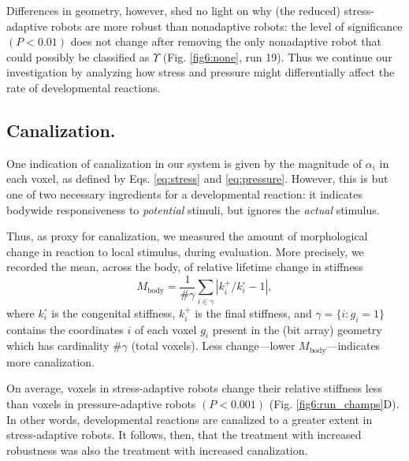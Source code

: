 Differences in geometry, however, shed no light on why (the reduced) stress-adaptive robots are more robust than nonadaptive robots:
the level of significance $(P<0.01)$ does not change after removing the only nonadaptive robot that could possibly be classified as $\Upsilon$ (Fig. \ref{fig6:none}, run 19). 
Thus we continue our investigation by analyzing how stress and pressure might differentially affect the rate of developmental reactions.


\subsection*{Canalization.}

One indication of canalization \citep{waddington1942canalization,kriegman2017morphological} in our system is given by the magnitude of $\alpha_i$ in each voxel, as defined by Eqs. \ref{eq:stress} and \ref{eq:pressure}.
However, this is but one of two necessary ingredients for a developmental reaction: it indicates bodywide responsiveness to \textit{potential} stimuli, but ignores the \textit{actual} stimulus.

Thus, as proxy for canalization, we measured the amount of morphological change in reaction to local stimulus, during evaluation.
More precisely, we recorded the mean, across the body, of relative lifetime change in stiffness
\begin{equation}
\label{eq:mu}
M_{\text{body}} = \frac{1}{\#\gamma} \sum_{i \in \gamma} \left| k_i^{+}/k_i^{\circ}-1 \right| ,
\end{equation}
where 
$k_i^{\circ}$ 
is the congenital stiffness,
$k_i^{+}$ is the final stiffness, and
$\gamma = \{i : g_i = 1 \}$ contains the coordinates $i$ of each voxel $g_i$ present in the (bit array) geometry which has cardinality $\#\gamma$ (total voxels). 
Less change---lower $M_{\text{body}}$---indicates more canalization.

On average, voxels in stress-adaptive robots change their relative stiffness less than voxels in pressure-adaptive robots $(P<0.001)$ (Fig. \ref{fig6:run_champs}D).
In other words, developmental reactions are canalized to a greater extent in stress-adaptive robots.
It follows, then, that the treatment with increased robustness was also the treatment with increased canalization.


